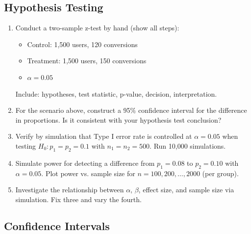 \subsection{Hypothesis Testing}

\begin{enumerate}
    \item Conduct a two-sample z-test by hand (show all steps):
    \begin{itemize}
        \item Control: 1,500 users, 120 conversions
        \item Treatment: 1,500 users, 150 conversions
        \item $\alpha = 0.05$
    \end{itemize}
    Include: hypotheses, test statistic, p-value, decision, interpretation.

    \item For the scenario above, construct a 95\% confidence interval for the difference in proportions. Is it consistent with your hypothesis test conclusion?

    \item Verify by simulation that Type I error rate is controlled at $\alpha = 0.05$ when testing $H_0: p_1 = p_2 = 0.1$ with $n_1 = n_2 = 500$. Run 10,000 simulations.

    \item Simulate power for detecting a difference from $p_1 = 0.08$ to $p_2 = 0.10$ with $\alpha = 0.05$. Plot power vs. sample size for $n = 100, 200, \ldots, 2000$ (per group).

    \item Investigate the relationship between $\alpha$, $\beta$, effect size, and sample size via simulation. Fix three and vary the fourth.
\end{enumerate}

\subsection{Confidence Intervals}

